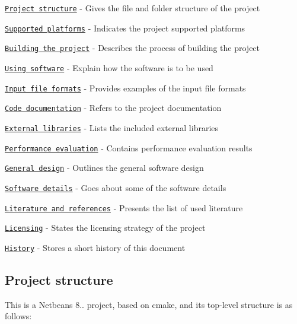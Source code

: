 \begin{DoxyEnumerate}
\item \href{#project-structure}{\tt Project structure} -\/ Gives the file and folder structure of the project
\item \href{#supported-platforms}{\tt Supported platforms} -\/ Indicates the project supported platforms
\item \href{#building-the-project}{\tt Building the project} -\/ Describes the process of building the project
\item \href{#using-software}{\tt Using software} -\/ Explain how the software is to be used
\item \href{#input-file-formats}{\tt Input file formats} -\/ Provides examples of the input file formats
\item \href{#code-documentation}{\tt Code documentation} -\/ Refers to the project documentation
\item \href{#external-libraries}{\tt External libraries} -\/ Lists the included external libraries
\item \href{#performance-evaluation}{\tt Performance evaluation} -\/ Contains performance evaluation results
\item \href{#general-design}{\tt General design} -\/ Outlines the general software design
\item \href{#software-details}{\tt Software details} -\/ Goes about some of the software details
\item \href{#literature-and-references}{\tt Literature and references} -\/ Presents the list of used literature
\item \href{#licensing}{\tt Licensing} -\/ States the licensing strategy of the project
\item \href{#history}{\tt History} -\/ Stores a short history of this document
\end{DoxyEnumerate}

\subsection*{Project structure}

This is a Netbeans 8.. project, based on cmake, and its top-\/level structure is as follows\+:


